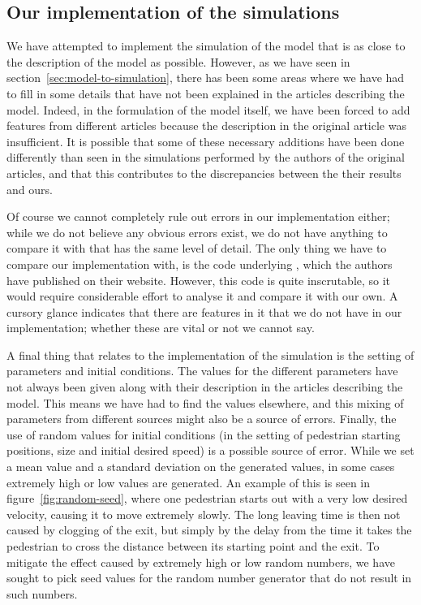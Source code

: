 \subsection{Our implementation of the simulations}
\label{sec:random-errors}
We have attempted to implement the simulation of the model that is as close to 
the description of the model as possible. However, as we have seen in 
section~\ref{sec:model-to-simulation}, there has been some areas where we have 
had to fill in some details that have not been explained in the articles 
describing the model. Indeed, in the formulation of the model itself, we have 
been forced to add features from different articles because the description in 
the original article was insufficient. It is possible that some of these 
necessary additions have been done differently than seen in the simulations 
performed by the authors of the original articles, and that this contributes 
to the discrepancies between the their results and ours.

Of course we cannot completely rule out errors in our implementation either; 
while we do not believe any obvious errors exist, we do not have anything to 
compare it with that has the same level of detail. The only thing we have to 
compare our implementation with, is the code underlying \cite{helbing00}, 
which the authors have published on their website. However, this code is quite 
inscrutable, so it would require considerable effort to analyse it and compare 
it with our own. A cursory glance indicates that there are features in it that 
we do not have in our implementation; whether these are vital or not we cannot 
say.

A final thing that relates to the implementation of the simulation is the 
setting of parameters and initial conditions. The values for the different 
parameters have not always been given along with their description in the 
articles describing the model. This means we have had to find the values 
elsewhere, and this mixing of parameters from different sources might also be 
a source of errors. 
Finally, the use of random values for initial conditions 
(in the setting of pedestrian starting positions, size and initial desired 
speed) is a possible source of error. While we set a mean value and a standard 
deviation on the generated values, in some cases extremely high or low values 
are generated. An example of this is seen in figure~\ref{fig:random-seed}, 
where one pedestrian starts out with a very low desired velocity, causing it 
to move extremely slowly. The long leaving time is then not caused by clogging 
of the exit, but simply by the delay from the time it takes the pedestrian to 
cross the distance between its starting point and the exit. To mitigate the 
effect caused by extremely high or low random numbers, we have sought to pick 
seed values for the random number generator that do not result in such 
numbers.

